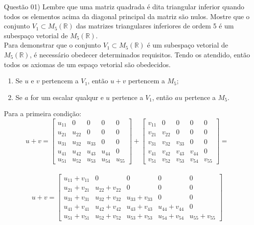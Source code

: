 
\noindent \textcolor{COLOR1}{Questão 01)} Lembre que uma matriz quadrada é dita triangular inferior quando todos os elementos acima da diagonal principal da matriz são nulos. Mostre que o conjunto $V_1\subset M_5 (\mathbb{R})$ das matrizes triangulares inferiores de ordem 5 é um subespaço vetorial de $M_5 (\mathbb{R})$.
\\

Para demonstrar que o conjunto $V_1\subset M_5 (\mathbb{R})$ é um subespaço vetorial de $M_5 (\mathbb{R})$, é necessário obedecer determinados requisitos. Tendo os atendido, então todos os axiomas de um espaço vetorial são obedecidos.

\begin{enumerate}
    \item Se $u$ e $v$ pertencem a $V_1$, então $u + v$ pertencem a $M_5$;
    \item Se $a$ for um escalar qualqur e $u$ pertence a $V_1$, então $au$ pertence a $M_5$.
\end{enumerate}

Para a primeira condição:\\
\[
    u + v =
    \begin{bmatrix}
        u_{11} & 0      & 0      & 0      & 0      \\
        u_{21} & u_{22} & 0      & 0      & 0      \\
        u_{31} & u_{32} & u_{33} & 0      & 0      \\
        u_{41} & u_{42} & u_{43} & u_{44} & 0      \\
        u_{51} & u_{52} & u_{53} & u_{54} & u_{55}
    \end{bmatrix} +
    \begin{bmatrix}
        v_{11} & 0      & 0      & 0      & 0      \\
        v_{21} & v_{22} & 0      & 0      & 0      \\
        v_{31} & v_{32} & v_{33} & 0      & 0      \\
        v_{41} & v_{42} & v_{43} & v_{44} & 0      \\
        v_{51} & v_{52} & v_{53} & v_{54} & v_{55}
    \end{bmatrix}=
\]
\\
\[
    u + v =
    \begin{bmatrix}
        u_{11}+v_{11} & 0             & 0             & 0             & 0             \\
        u_{21}+v_{21} & u_{22}+v_{22} & 0             & 0             & 0             \\
        u_{31}+v_{31} & u_{32}+v_{32} & u_{33}+v_{33} & 0             & 0             \\
        u_{41}+v_{41} & u_{42}+v_{42} & u_{43}+v_{43} & u_{44}+v_{44} & 0             \\
        u_{51}+v_{51} & u_{52}+v_{52} & u_{53}+v_{53} & u_{54}+v_{54} & u_{55}+v_{55}
    \end{bmatrix}
\]
\\

